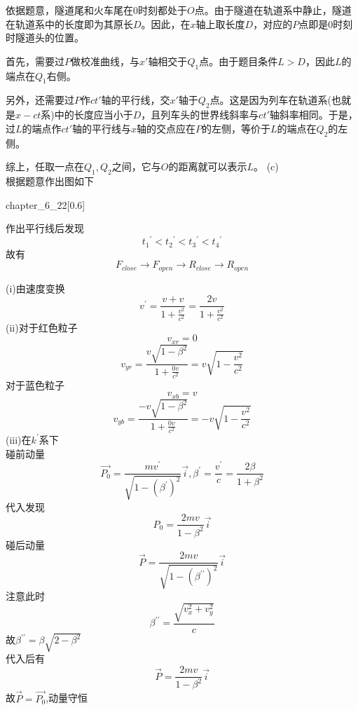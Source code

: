 \begin{solution}
    
    依据题意，隧道尾和火车尾在$0$时刻都处于$O$点。由于隧道在轨道系中静止，隧道在轨道系中的长度即为其原长$D$。因此，在$x$轴上取长度$D$，对应的$P$点即是$0$时刻时隧道头的位置。
    
    首先，需要过$P$做校准曲线，与$x'$轴相交于$Q_1$点。由于题目条件$L>D$，因此$L$的端点在$Q_1$右侧。
    
    另外，还需要过$P$作$ct'$轴的平行线，交$x'$轴于$Q_2$点。这是因为列车在轨道系(也就是$x-ct$系)中的长度应当小于$D$，且列车头的世界线斜率与$ct'$轴斜率相同。于是，过$L$的端点作$ct'$轴的平行线与$x$轴的交点应在$P$的左侧，等价于$L$的端点在$Q_2$的左侧。
    
    综上，任取一点在$Q_1,Q_2$之间，它与$O$的距离就可以表示$L$。
    (c)\\
    根据题意作出图如下
    \begin{singlefigure}{chapter_6_22}[0.6]   
    \end{singlefigure}
    作出平行线后发现
    \[{t_1}^{\prime}<{t_2}^{\prime}<{t_3}^{\prime}<{t_4}^{\prime}\]
    故有
    \[F_{close}\rightarrow F_{open}\rightarrow R_{close}\rightarrow R_{open}\]
\end{solution}
\begin{solution}
      (i)由速度变换 
        \[v^{\prime}=\frac{v+v}{1+\frac{v^{2}}{c^{2}}}=\frac{2v}{1+\frac{v^{2}}{c^{2}}} \]
      (ii)对于红色粒子
        \[v_{xr}=0\]
        \[v_{yr}=\frac{v\sqrt{1-\beta^{2}}}{1+\frac{0v}{c^{2}}}=v\sqrt{1-\frac{v^{2}}{c^{2}}}\] 
        对于蓝色粒子
        \[v_{xb}=v\] 
        \[v_{yb}=\frac{-v\sqrt{1-\beta^{2}}}{1+\frac{0v}{c^{2}}}=-v\sqrt{1-\frac{v^{2}}{c^{2}}} \]
     (iii)在$k^{\prime}$系下\\
         碰前动量
        \[\overrightarrow{P_{0}}=\frac{mv^{\prime}}{\sqrt{1-(\beta^{\prime})^{2}}}\overrightarrow{i},\beta^{\prime}=\frac{v^{\prime}}{c}=\frac{2\beta}{1+\beta^{2}}\]
        代入发现
        \[P_{0}=\frac{2mv}{1-\beta^{2}}\overrightarrow{i}\]
        碰后动量
        \[\overrightarrow{P}=\frac{2mv}{\sqrt{1-(\beta^{\prime\prime})^{2}}}\overrightarrow{i}\]
        注意此时
        \[\beta^{\prime\prime}=\frac{\sqrt{v_x^{2}+v_y^{2}}}{c}\]
        故$\beta^{\prime\prime}=\beta\sqrt{2-\beta^{2}}$\\
        代入后有
        \[\overrightarrow{P}=\frac{2mv}{1-\beta^{2}}\overrightarrow{i}\]
        故$\overrightarrow{P}=\overrightarrow{P_{0}}$,动量守恒

\end{solution}

